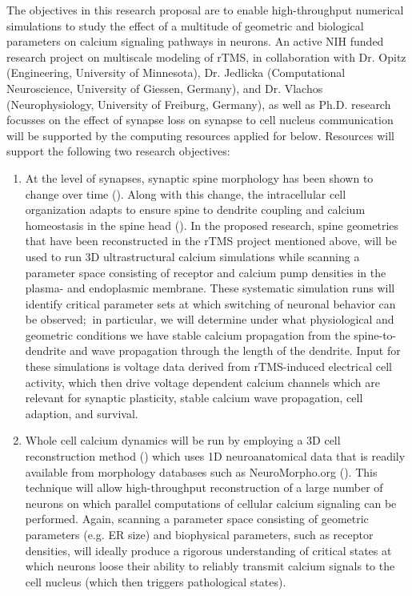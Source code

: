 The objectives in this research proposal are to enable high-throughput numerical simulations to study the effect of a multitude of geometric and biological parameters on calcium signaling pathways in neurons. An active NIH funded research project on multiscale modeling of rTMS, in collaboration with Dr. Opitz (Engineering, University of Minnesota), Dr. Jedlicka (Computational Neuroscience, University of Giessen, Germany), and Dr. Vlachos (Neurophysiology, University of Freiburg, Germany), as well as Ph.D. research focusses on the effect of synapse loss on synapse to cell nucleus communication will be supported by the computing resources applied for below. Resources will support the following two research objectives: 
\begin{enumerate}
\item At the level of synapses, synaptic spine morphology has been shown to change over time (\cite{Segal2014,Maggio2014,Verkhratsky2005,Finch2012,Jedlicka2017}). Along with this change, the intracellular cell organization adapts to ensure spine to dendrite coupling and calcium homeostasis in the spine head (\cite{Breit2018b}). In the proposed research, spine geometries that have been reconstructed in the rTMS project mentioned above, will be used to run 3D ultrastructural calcium simulations while scanning a parameter space consisting of receptor and calcium pump densities in the plasma- and endoplasmic membrane. These systematic simulation runs will identify critical parameter sets at which switching of neuronal behavior can be observed;{$\ $  in particular, we will determine under what physiological and geometric conditions we have stable calcium propagation from the spine-to-dendrite and wave propagation through the length of the dendrite}. Input for these simulations is voltage data derived from rTMS-induced electrical cell activity, which then drive {voltage dependent calcium channels which are} relevant for synaptic plasticity, {stable calcium wave propagation}, cell adaption, and survival. 

\item Whole cell calcium dynamics will be run by employing a 3D cell reconstruction method (\cite{Moerschel2017, Grein2020}) which uses 1D neuroanatomical data that is readily available from morphology databases such as NeuroMorpho.org (\cite{Ascoli2007}). This technique will allow high-throughput reconstruction of a large number of neurons on which parallel computations of cellular calcium signaling can be performed. Again, scanning a parameter space consisting of geometric parameters (e.g. ER size) and biophysical parameters, such as receptor densities, will ideally produce a rigorous understanding of critical states at which neurons loose their ability to reliably transmit calcium signals to the cell nucleus (which then triggers pathological states). 
\end{enumerate}
